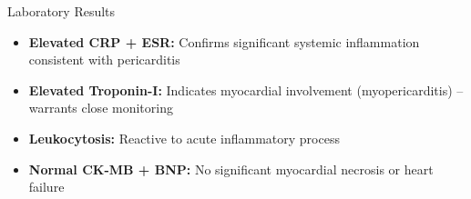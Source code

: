 \documentclass[10pt,aspectratio=169]{beamer}
\begin{document}
\begin{frame}{Laboratory Results}
  \begin{tcolorbox}[highlightbox,title={\faSearchPlus\hspace{4pt}Key Laboratory Findings}]
    \small
    \begin{itemize}
      \item \textbf{Elevated CRP + ESR:} Confirms significant systemic inflammation consistent with pericarditis
      \item \textbf{Elevated Troponin-I:} Indicates myocardial involvement (myopericarditis) -- warrants close monitoring
      \item \textbf{Leukocytosis:} Reactive to acute inflammatory process
      \item \textbf{Normal CK-MB + BNP:} No significant myocardial necrosis or heart failure
    \end{itemize}
  \end{tcolorbox}
\end{frame}
\end{document}
